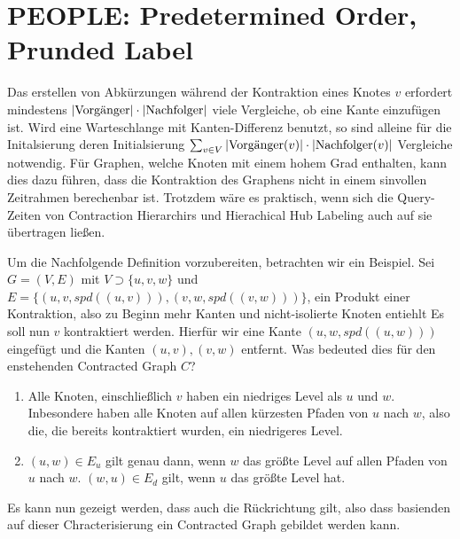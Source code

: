 \chapter{PEOPLE: Predetermined Order, Prunded Label}\label{chapter:peopel}

Das erstellen von Abkürzungen während der Kontraktion eines Knotes $v$ erfordert mindestens $\abs{\text{Vorgänger}} \cdot \abs{\text{Nachfolger}}$ viele Vergleiche, ob eine Kante einzufügen ist.
Wird eine Warteschlange mit Kanten-Differenz benutzt, so sind alleine für die Initalsierung deren Initialsierung $\sum_{v \in V} \abs{\text{Vorgänger}(v)} \cdot \abs{\text{Nachfolger}(v)}$ Vergleiche notwendig.
Für Graphen, welche Knoten mit einem hohem Grad enthalten, kann dies dazu führen, dass die Kontraktion des Graphens nicht in einem sinvollen Zeitrahmen berechenbar ist.
Trotzdem wäre es praktisch, wenn sich die Query-Zeiten von Contraction Hierarchirs und Hierachical Hub Labeling auch auf sie übertragen ließen.

Um die Nachfolgende Definition vorzubereiten, betrachten wir ein Beispiel.
Sei $G = (V, E)$ mit $V \supset \{ u, v, w \}$ und $E = \{ (u, v, {spd}((u, v))), (v, w, {spd}((v, w))) \}$, ein Produkt einer Kontraktion, also zu Beginn mehr Kanten und nicht-isolierte Knoten entiehlt
Es soll nun $v$ kontraktiert werden.
Hierfür wir eine Kante $(u, w, {spd}((u, w)))$ eingefügt und die Kanten $(u, v), (v, w)$ entfernt.
Was bedeuted dies für den enstehenden Contracted Graph $C$?
\begin{enumerate}
    \item
          Alle Knoten, einschließlich $v$ haben ein niedriges Level als $u$ und $w$.
          Inbesondere haben alle Knoten auf allen kürzesten Pfaden von $u$ nach $w$, also die, die bereits kontraktiert wurden, ein niedrigeres Level.

    \item
          $(u, w) \in E_u$ gilt genau dann, wenn $w$ das größte Level auf allen Pfaden von $u$ nach $w$.
          $(w, u) \in E_d$ gilt, wenn $u$ das größte Level hat.
\end{enumerate}

Es kann nun gezeigt werden, dass auch die Rückrichtung gilt, also dass basienden auf dieser Chracterisierung ein Contracted Graph gebildet werden kann.

